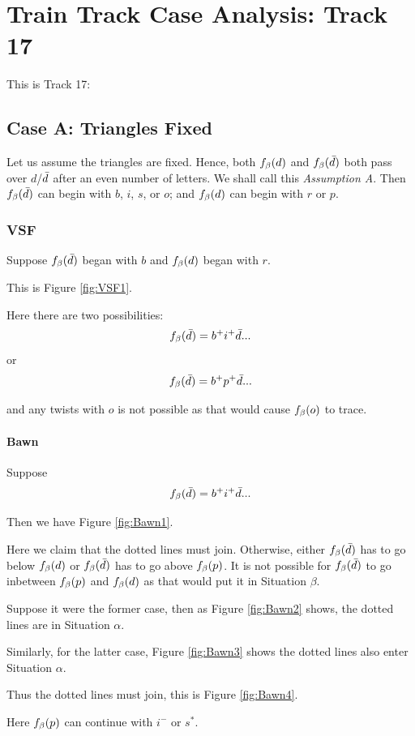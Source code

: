 \chapter[Train Track Case Analysis: Track 17]{Train Track Case Analysis: Track 17}
\label{app:case_analysis_track17}

This is Track 17:

\section{Case A: Triangles Fixed}\label{CaseA Track 17}
Let us assume the triangles are fixed. Hence, both $f_\beta(d)$ and $f_\beta(\bar{d})$ both pass over $d$/$\bar{d}$ after an even number of letters. We shall call this \textit{Assumption A}. Then $f_\beta(\bar{d})$ can begin with $b$, $i$, $s$, or $o$; and $f_\beta(d)$ can begin with $r$ or $p$.

\subsection{VSF}\label{VSF}
Suppose $f_\beta(\bar{d})$ began with $b$ and $f_\beta(d)$ began with $r$.

This is Figure \ref{fig:VSF1}.

Here there are two possibilities:
\[
f_\beta(\bar{d}) = b^+ i^+ \bar{d}...
\]
or
\[
f_\beta(\bar{d}) = b^+ p^+ \bar{d}...
\]

and any twists with $o$ is not possible as that would cause $f_\beta(o)$ to trace.
\subsubsection{Bawn}\label{Bawn}
Suppose
\[
f_\beta(\bar{d}) = b^+ i^+ \bar{d}...
\]

Then we have Figure \ref{fig:Bawn1}.

Here we claim that the dotted lines must join. Otherwise, either $f_\beta(\bar{d})$ has to go below $f_\beta(d)$ or $f_\beta(\bar{d})$ has to go above $f_\beta(p)$. It is not possible for $f_\beta(\bar{d})$ to go inbetween $f_\beta(p)$ and $f_\beta(d)$ as that would put it in Situation $\beta$.

Suppose it were the former case, then as Figure \ref{fig:Bawn2} shows, the dotted lines are in Situation $\alpha$.

Similarly, for the latter case, Figure \ref{fig:Bawn3} shows the dotted lines also enter Situation $\alpha$.

Thus the dotted lines must join, this is Figure \ref{fig:Bawn4}.

Here $f_\beta(p)$ can continue with $i^-$ or $s^*$.

